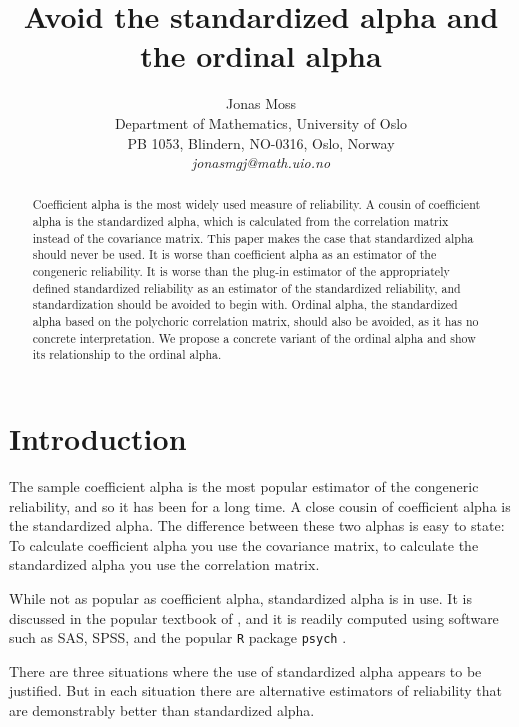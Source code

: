 \documentclass[twoside]{article}
\title{Avoid the standardized alpha and the ordinal alpha}
\author{
  Jonas Moss \orcid{0000-0002-6876-6964} \\
  Department of Mathematics, University of Oslo\\
  PB 1053, Blindern, NO-0316, Oslo, Norway \\
  \it{jonasmgj@math.uio.no}
}
\begin{document}
\maketitle

\begin{abstract}
Coefficient alpha is the most widely used measure of reliability. A cousin of coefficient alpha is the standardized alpha, which is calculated from the correlation matrix instead of the covariance matrix. This paper makes the case that standardized alpha should never be used. It is worse than coefficient alpha as an estimator of the congeneric reliability. It is worse than the plug-in estimator of the appropriately defined standardized reliability as an estimator of the standardized reliability, and standardization should be avoided to begin with. Ordinal alpha, the standardized alpha based on the polychoric correlation matrix, should also be avoided, as it has no concrete interpretation. We propose a concrete variant of the ordinal alpha and show its relationship to the ordinal alpha.
\end{abstract}


\section{Introduction}

The sample coefficient alpha is the most popular estimator of the congeneric reliability, and so it has been for a long time. A close cousin of coefficient alpha is the standardized alpha. The difference between these two alphas is easy to state: To calculate coefficient alpha you use the covariance matrix, to calculate the standardized alpha you use the correlation matrix. 

While not as popular as coefficient alpha, standardized alpha is in use. It is discussed in the popular textbook of \citet[pp. 139--141]{Furr2013-yu}, and it is readily computed using software such as SAS, SPSS, and the popular \texttt{R} \citep{Team2013-tt} package \texttt{psych} \citep{psych}. 

There are three situations where the use of standardized alpha appears to be justified. But in each situation there are alternative estimators of reliability that are demonstrably better than standardized alpha. 
\end{document}
